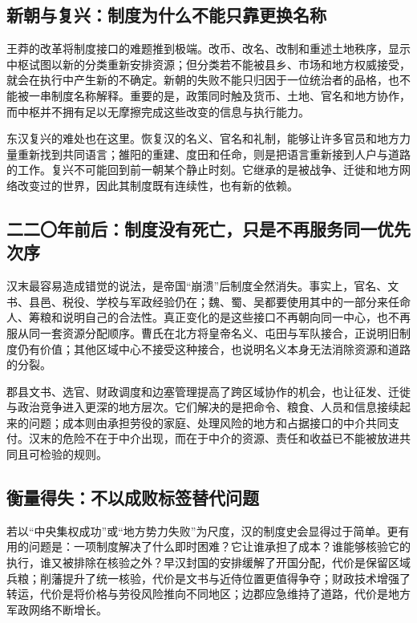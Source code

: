 \subsection{新朝与复兴：制度为什么不能只靠更换名称}

王莽的改革将制度接口的难题推到极端。改币、改名、改制和重述土地秩序，显示中枢试图以新的分类重新安排资源；但分类若不能被县乡、市场和地方权威接受，就会在执行中产生新的不确定。新朝的失败不能只归因于一位统治者的品格，也不能被一串制度名称解释。重要的是，政策同时触及货币、土地、官名和地方协作，而中枢并不拥有足以无摩擦完成这些改变的信息与执行能力。

东汉复兴的难处也在这里。恢复汉的名义、官名和礼制，能够让许多官员和地方力量重新找到共同语言；雒阳的重建、度田和任命，则是把语言重新接到人户与道路的工作。复兴不可能回到前一朝某个静止时刻。它继承的是被战争、迁徙和地方网络改变过的世界，因此其制度既有连续性，也有新的依赖。

\subsection{二二〇年前后：制度没有死亡，只是不再服务同一优先次序}

汉末最容易造成错觉的说法，是帝国“崩溃”后制度全然消失。事实上，官名、文书、县邑、税役、学校与军政经验仍在；魏、蜀、吴都要使用其中的一部分来任命人、筹粮和说明自己的合法性。真正变化的是这些接口不再朝向同一中心，也不再服从同一套资源分配顺序。曹氏在北方将皇帝名义、屯田与军队接合，正说明旧制度仍有价值；其他区域中心不接受这种接合，也说明名义本身无法消除资源和道路的分裂。

\begin{turningpoint}
郡县文书、选官、财政调度和边塞管理提高了跨区域协作的机会，也让征发、迁徙与政治竞争进入更深的地方层次。它们解决的是把命令、粮食、人员和信息接续起来的问题；成本则由承担劳役的家庭、处理风险的地方和占据接口的中介共同支付。汉末的危险不在于中介出现，而在于中介的资源、责任和收益已不能被放进共同且可检验的规则。
\end{turningpoint}

\subsection{衡量得失：不以成败标签替代问题}

若以“中央集权成功”或“地方势力失败”为尺度，汉的制度史会显得过于简单。更有用的问题是：一项制度解决了什么即时困难？它让谁承担了成本？谁能够核验它的执行，谁又被排除在核验之外？早汉封国的安排缓解了开国分配，代价是保留区域兵粮；削藩提升了统一核验，代价是文书与近侍位置更值得争夺；财政技术增强了转运，代价是将价格与劳役风险推向不同地区；边郡应急维持了道路，代价是地方军政网络不断增长。

